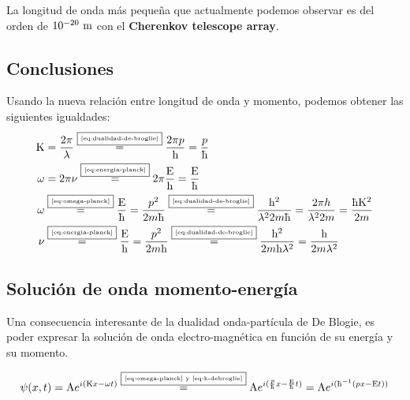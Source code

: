 \begin{note}
    La longitud de onda más pequeña que actualmente podemos observar es del orden de $10^{-20}\ \mathrm{m}$ con el \textbf{Cherenkov telescope array}.
\end{note}

\subsection{Conclusiones}\label{subsec:conclusiones}
Usando la nueva relación entre longitud de onda y momento, podemos obtener las siguientes igualdades:
\begin{align}
    \label{eq:k-debroglie}
    \longondaangular &= \frac{2\pi}{\longonda}\by{\ref{eq:dualidad-de-broglie}}\frac{2\pi p}{\plancksymbol}=\frac{p}{\planckbarsymbol}\\
    \label{eq:omega-planck}
    \frecuenciaangular &= 2\pi\frecuencia\by{\ref{eq:energia-planck}}2\pi\frac{\energia}{\plancksymbol}=\frac{\energia}{\planckbarsymbol} \\
    \label{eq:omega_debroglie}
    \frecuenciaangular &\by{\ref{eq:omega-planck}}\frac{\energia}{\planckbarsymbol}=\frac{p^2}{2m\planckbarsymbol}\by{\ref{eq:dualidad-de-broglie}}\frac{\plancksymbol^2}{\longonda^2 2m\planckbarsymbol}=\frac{2\pi h}{\lambda^2 2m}=\frac{\planckbarsymbol \longondaangular^2}{2m}\\
    \label{eq:frecuencia_debroglie}
    \nu &\by{\ref{eq:energia-planck}}\frac{\energia}{\plancksymbol}=\frac{p^2}{2m\plancksymbol}\by{\ref{eq:dualidad-de-broglie}}\frac{\plancksymbol^2}{2m\plancksymbol\longonda^2}=\frac{\plancksymbol}{2m\longonda^{2}}
\end{align}

\subsection{Solución de onda momento-energía}\label{subsec:solucion-de-onda-momento-energia}
Una consecuencia interesante de la dualidad onda-partícula de De Blogie, es poder expresar la solución de onda electro-magnética en función de su energía y su momento.

\begin{equation}
    \label{eq:ecuacion_onda_momento_energia}
    \psi(x,t)=\amplitud e^{i(\longondaangular x - \frecuenciaangular t)}\by{\ref{eq:omega-planck} y~\ref{eq:k-debroglie}}\amplitud e^{i(\frac{p}{\planckbarsymbol}x - \frac{\energia}{\planckbarsymbol} t)}=\amplitud e^{i(\planckbarsymbol^{-1}(p x - \energia t))}
\end{equation}

